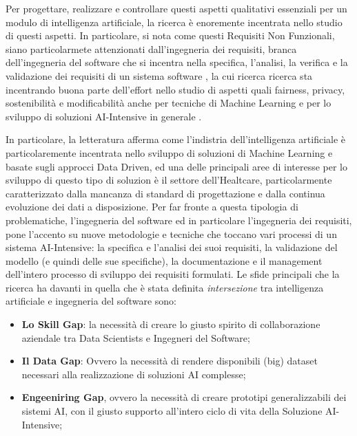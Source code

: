 Per progettare, realizzare e controllare questi aspetti qualitativi essenziali per un modulo di intelligenza artificiale, la ricerca è enoremente incentrata nello studio di questi aspetti. In particolare, si nota come questi Requisiti Non Funzionali, siano particolarmete attenzionati dall'ingegneria dei requisiti, branca dell'ingegneria del software che si incentra nella specifica, l'analisi, la verifica e la validazione dei requisiti di un sistema software \cite{RE&Ai}, la cui ricerca ricerca sta incentrando buona parte dell'effort nello studio di aspetti quali fairness, privacy, sostenibilità e modificabilità anche per tecniche di Machine Learning e per lo sviluppo di soluzioni AI-Intensive in generale \cite{NFRForML}.

\cite{RE&Ai}In particolare, la letteratura afferma come l'indistria dell'intelligenza artificiale è particolaremente incentrata nello sviluppo di soluzioni di Machine Learning e basate sugli approcci Data Driven, ed una delle principali aree di interesse per lo sviluppo di questo tipo di soluzion è il settore dell'Healtcare, particolarmente caratterizzato dalla mancanza di standard di progettazione e dalla continua evoluzione dei dati a disposizione. Per far fronte a questa tipologia di problematiche, l'ingegneria del software ed in particolare l'ingegneria dei requisiti, pone l'accento su nuove metodologie e tecniche che toccano vari processi di un sistema AI-Intensive: la specifica e l'analisi dei suoi requisiti, la validazione del modello (e quindi delle sue specifiche), la documentazione e il management dell'intero processo di sviluppo dei requisiti formulati. Le sfide principali che la ricerca ha davanti in quella che è stata definita \textit{intersezione} tra intelligenza artificiale e ingegneria del software sono:

\begin{itemize}
    \item \textbf{Lo Skill Gap}: la necessità di creare lo giusto spirito di collaborazione aziendale tra Data Scientists e Ingegneri del Software;
    \item \textbf{Il Data Gap}: Ovvero la necessità di rendere disponibili (big) dataset necessari alla realizzazione di soluzioni AI complesse;
    \item \textbf{Engeeniring Gap}, ovvero la necessità di creare prototipi generalizzabili dei sistemi AI, con il giusto supporto all'intero ciclo di vita della Soluzione AI-Intensive;
\end{itemize}

